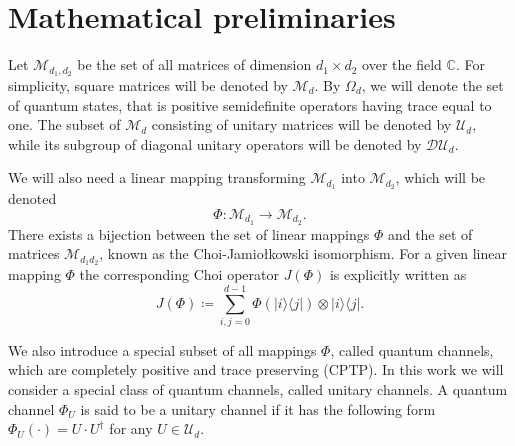 \documentclass[preprint,12pt, a4paper, dvipsnames]{elsarticle}
\newcommand{\ket}[1]{\ensuremath{|#1\rangle}}
\newcommand{\bra}[1]{\ensuremath{\langle#1|}}
\newcommand{\ketbra}[2]{\ensuremath{\ket{#1}\bra{#2}}}
\newcommand{\1}{{\rm 1\hspace{-0.9mm}l}}
\newcommand{\DD}{\mathcal{D}}
\newcommand{\UU}{\mathcal{U}}
\theoremstyle{definition}
\begin{document}
\begin{thebibliography}{00}
\end{thebibliography}


\appendix


\section{Mathematical preliminaries} \label{app:preliminaries}


Let $\mathcal{M}_{d_1,d_2}$ be the set of all matrices of dimension $d_1 \times d_2$ over
the field $\mathbb{C}$. For  simplicity, square matrices will be denoted by
$\mathcal{M}_d$.
By $\Omega_d$, we will denote the set of quantum states, that is
positive semidefinite operators having trace equal to one.
The subset of $\mathcal{M}_d$ consisting of unitary matrices will be denoted
by $\UU_d$, while its subgroup of diagonal unitary operators will be denoted by
$\DD \UU_d$.


We will also need a linear mapping transforming $\mathcal{M}_{d_1}$ into
$\mathcal{M}_{d_2}$, which will be denoted
\begin{equation}
\Phi: \mathcal{M}_{d_1 } \rightarrow \mathcal{M}_{d_2}.
\end{equation}
There
exists a bijection between the set of linear mappings $\Phi$ and the set of matrices $\mathcal{M}_{d_1d_2}$,  known as the Choi-Jamio{\l}kowski isomorphism.
For a given linear mapping $\Phi$ the corresponding Choi operator $J(\Phi)$ is explicitly written as
\begin{equation}
J(\Phi) \coloneqq \sum_{i,j=0}^{d- 1} \Phi(\ketbra{i}{j}) \otimes \ketbra{i}{j}. \end{equation}

We also introduce a special subset of all mappings $\Phi$, called quantum channels, which are completely positive
and trace preserving (CPTP).
In this work we will consider a special class of quantum channels, called unitary channels.  A
quantum channel
$\Phi_{U}$ is said to be a unitary channel if it has the following form $\Phi_U(\cdot) = U \cdot U^\dagger$ for any $U \in
\UU_d$.
\end{document}
